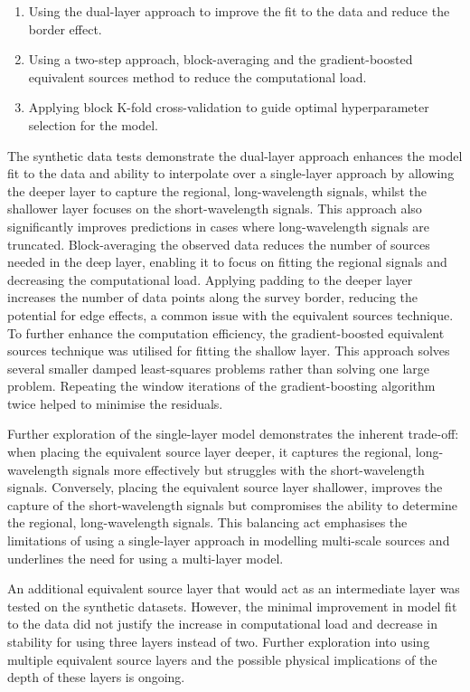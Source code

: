 \begin{enumerate}
    \item Using the dual-layer approach to improve the fit to the data and reduce the border effect.
    \item Using a two-step approach, block-averaging and the gradient-boosted equivalent sources method to reduce the computational load.
    \item Applying block K-fold cross-validation to guide optimal hyperparameter selection for the model.
\end{enumerate}

The synthetic data tests demonstrate the dual-layer approach enhances the model fit to the data and ability to interpolate over a single-layer approach by allowing the deeper layer to capture the regional, long-wavelength signals, whilst the shallower layer focuses on the short-wavelength signals. This approach also significantly improves predictions in cases where long-wavelength signals are truncated. Block-averaging the observed data reduces the number of sources needed in the deep layer, enabling it to focus on fitting the regional signals and decreasing the computational load. Applying padding to the deeper layer increases the number of data points along the survey border, reducing the potential for edge effects, a common issue with the equivalent sources technique. To further enhance the computation efficiency, the gradient-boosted equivalent sources technique was utilised for fitting the shallow layer. This approach solves several smaller damped least-squares problems rather than solving one large problem. Repeating the window iterations of the gradient-boosting algorithm twice helped to minimise the residuals.

Further exploration of the single-layer model demonstrates the inherent trade-off: when placing the equivalent source layer deeper, it captures the regional, long-wavelength signals more effectively but struggles with the short-wavelength signals. Conversely, placing the equivalent source layer shallower, improves the capture of the short-wavelength signals but compromises the ability to determine the regional, long-wavelength signals. This balancing act emphasises the limitations of using a single-layer approach in modelling multi-scale sources and underlines the need for using a multi-layer model.

An additional equivalent source layer that would act as an intermediate layer was tested on the synthetic datasets. However, the minimal improvement in model fit to the data did not justify the increase in computational load and decrease in stability for using three layers instead of two. Further exploration into using multiple equivalent source layers and the possible physical implications of the depth of these layers is ongoing.

